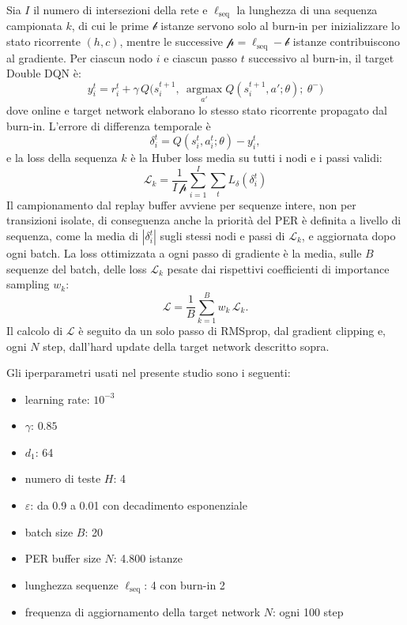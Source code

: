 Sia $I$ il numero di intersezioni della rete e $\ell_{\text{seq}}$ la lunghezza di una sequenza campionata $k$,
di cui le prime $\mathscr{b}$ istanze servono solo al burn-in per inizializzare lo stato ricorrente $(h,c)$,
mentre le successive $\mathscr{p} = \ell_{\text{seq}} - \mathscr{b}$ istanze contribuiscono al gradiente.
Per ciascun nodo $i$ e ciascun passo $t$ successivo al burn-in, il target Double DQN è:
\begin{equation}
  y_i^t = r_i^t + \gamma\, Q\big(s_i^{t+1},\ \operatorname*{argmax}_{a'} Q(s_i^{t+1}, a'; \theta);\ \theta^-\big)
  \label{eq:double-dqn-target}
\end{equation}
dove online e target network elaborano lo stesso stato ricorrente propagato dal burn-in.
L'errore di differenza temporale è
\[\delta_i^t = Q(s_i^t, a_i^t; \theta) - y_i^t,\]
e la loss della sequenza $k$ è la Huber loss media su tutti i nodi e i passi
validi:
\begin{equation}
  \mathcal{L}_k = \frac{1}{I\,\mathscr{p}} \sum_{i=1}^{I} \sum_{t} L_\delta(\delta_i^t)
\end{equation}
Il campionamento dal replay buffer avviene per sequenze intere, non per
transizioni isolate, di conseguenza anche la priorità del PER è definita a
livello di sequenza, come la media di $|\delta_i^t|$ sugli stessi nodi e
passi di $\mathcal{L}_k$, e aggiornata dopo ogni batch. La loss ottimizzata a
ogni passo di gradiente è la media, sulle $B$ sequenze del batch, delle loss
$\mathcal{L}_k$ pesate dai rispettivi coefficienti di importance sampling
$w_k$:
\begin{equation}
  \mathcal{L} = \frac{1}{B} \sum_{k=1}^{B} w_k\, \mathcal{L}_k .
\end{equation}
Il calcolo di \(\mathcal{L}\) è seguito da un solo passo di RMSprop,
dal gradient clipping e, ogni $N$ step, dall'hard update della target network
descritto sopra.

Gli iperparametri usati nel presente studio sono i seguenti:
\begin{itemize}
  \item learning rate: $10^{-3} $
  \item $\gamma$: $0.85$
  \item $d_1$: 64
  \item numero di teste $H$: 4
  \item $\varepsilon$: da 0.9 a 0.01 con decadimento esponenziale
  \item batch size $B$: 20
  \item PER buffer size $N$: 4.800 istanze
  \item lunghezza sequenze $\ell_{\text{seq}}$: 4 con burn-in 2
  \item frequenza di aggiornamento della target network $N$: ogni 100 step
\end{itemize}

